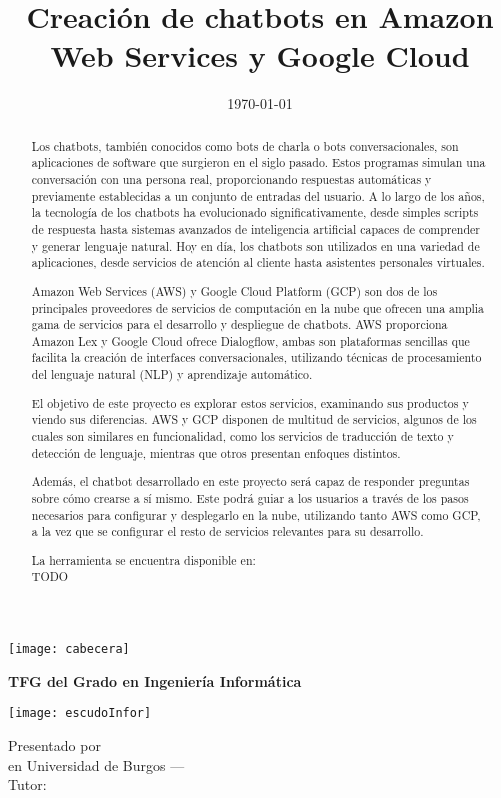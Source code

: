 \documentclass[a4paper,12pt,twoside]{memoir}
\title{Creación de chatbots en Amazon Web Services y Google Cloud}
\author{\nombre}
\date{\today}
\makeatletter
\def\maketitle{
  \null
  \thispagestyle{empty}
  \noindent\texttt{[image: cabecera]}\vspace{1cm}%
  \vfill
  \colorbox{cpardoBox}{%
    \begin{minipage}{.8\textwidth}
      \vspace{.5cm}\Large
      \begin{center}
      \textbf{TFG del Grado en Ingeniería Informática}\vspace{.6cm}\\
      \textbf{\LARGE\@title{}}
      \end{center}
      \vspace{.2cm}
    \end{minipage}
  }%
  \hfill\begin{minipage}{.20\textwidth}
    \texttt{[image: escudoInfor]}
  \end{minipage}
  \vfill
  \begin{center}%
  {%
    \noindent\LARGE
    Presentado por \@author{}\\ 
    en Universidad de Burgos --- \@date{}\\
    Tutor: \@tutor{}\\
  }%
  \end{center}%
  \null
  \cleardoublepage
}
\makeatother
\begin{document}
\maketitle

\newpage\null\thispagestyle{empty}\newpage

\newpage\null\thispagestyle{empty}\newpage




\frontmatter

\renewcommand*\abstractname{Resumen}
\begin{abstract}
Los chatbots, también conocidos como bots de charla o bots conversacionales, son aplicaciones de software que surgieron en el siglo pasado. Estos programas simulan una conversación con una persona real, proporcionando respuestas automáticas y previamente establecidas a un conjunto de entradas del usuario. A lo largo de los años, la tecnología de los chatbots ha evolucionado significativamente, desde simples scripts de respuesta hasta sistemas avanzados de inteligencia artificial capaces de comprender y generar lenguaje natural. Hoy en día, los chatbots son utilizados en una variedad de aplicaciones, desde servicios de atención al cliente hasta asistentes personales virtuales.

Amazon Web Services (AWS) y Google Cloud Platform (GCP) son dos de los principales proveedores de servicios de computación en la nube que ofrecen una amplia gama de servicios para el desarrollo y despliegue de chatbots. AWS proporciona Amazon Lex y  Google Cloud ofrece Dialogflow, ambas son plataformas sencillas que facilita la creación de interfaces conversacionales, utilizando técnicas de procesamiento del lenguaje natural (NLP) y aprendizaje automático.

El objetivo de este proyecto es explorar estos servicios, examinando sus productos y viendo sus diferencias. AWS y GCP disponen de multitud de servicios, algunos de los cuales son similares en funcionalidad, como los servicios de traducción de texto y detección de lenguaje, mientras que otros presentan enfoques distintos. 

Además, el chatbot desarrollado en este proyecto será capaz de responder preguntas sobre cómo crearse a sí mismo. Este podrá guiar a los usuarios a través de los pasos necesarios para configurar y desplegarlo en la nube, utilizando tanto AWS como GCP, a la vez que se configurar el resto de servicios relevantes para su desarrollo. 

La herramienta se encuentra disponible en: \\TODO

\end{abstract}
\end{document}
